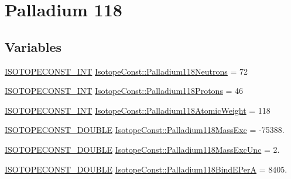 \hypertarget{group___isotope_const-_palladium-_pd118}{}\section{Palladium 118}
\label{group___isotope_const-_palladium-_pd118}
\subsection*{Variables}
\begin{DoxyCompactItemize}
\item 
\mbox{\hyperlink{group___isotope_const-_macros_ga5f18360b3e99483a35c32d789e62621c}{I\+S\+O\+T\+O\+P\+E\+C\+O\+N\+S\+T\+\_\+\+I\+NT}} \mbox{\hyperlink{group___isotope_const-_palladium-_pd118_ga8ef84c6b5b2c976c7a310cade2a8bde7}{Isotope\+Const\+::\+Palladium118\+Neutrons}} = 72
\item 
\mbox{\hyperlink{group___isotope_const-_macros_ga5f18360b3e99483a35c32d789e62621c}{I\+S\+O\+T\+O\+P\+E\+C\+O\+N\+S\+T\+\_\+\+I\+NT}} \mbox{\hyperlink{group___isotope_const-_palladium-_pd118_gad9a65e377ca59c6a1a2acfff2982f5be}{Isotope\+Const\+::\+Palladium118\+Protons}} = 46
\item 
\mbox{\hyperlink{group___isotope_const-_macros_ga5f18360b3e99483a35c32d789e62621c}{I\+S\+O\+T\+O\+P\+E\+C\+O\+N\+S\+T\+\_\+\+I\+NT}} \mbox{\hyperlink{group___isotope_const-_palladium-_pd118_ga10a4293902082b8e6ba91dbbd485706d}{Isotope\+Const\+::\+Palladium118\+Atomic\+Weight}} = 118
\item 
\mbox{\hyperlink{group___isotope_const-_macros_ga8f45a7272ce02c0b4c65c44636ed719a}{I\+S\+O\+T\+O\+P\+E\+C\+O\+N\+S\+T\+\_\+\+D\+O\+U\+B\+LE}} \mbox{\hyperlink{group___isotope_const-_palladium-_pd118_gabb10d481f99a59fb1130ced55c76573c}{Isotope\+Const\+::\+Palladium118\+Mass\+Exc}} = -\/75388.
\item 
\mbox{\hyperlink{group___isotope_const-_macros_ga8f45a7272ce02c0b4c65c44636ed719a}{I\+S\+O\+T\+O\+P\+E\+C\+O\+N\+S\+T\+\_\+\+D\+O\+U\+B\+LE}} \mbox{\hyperlink{group___isotope_const-_palladium-_pd118_ga39d49f372455edc92f4ebb67ff585486}{Isotope\+Const\+::\+Palladium118\+Mass\+Exc\+Unc}} = 2.
\item 
\mbox{\hyperlink{group___isotope_const-_macros_ga8f45a7272ce02c0b4c65c44636ed719a}{I\+S\+O\+T\+O\+P\+E\+C\+O\+N\+S\+T\+\_\+\+D\+O\+U\+B\+LE}} \mbox{\hyperlink{group___isotope_const-_palladium-_pd118_gac0292212aa7822c805570eee3fbbb010}{Isotope\+Const\+::\+Palladium118\+Bind\+E\+PerA}} = 8405.
\item 

\end{DoxyCompactItemize}
